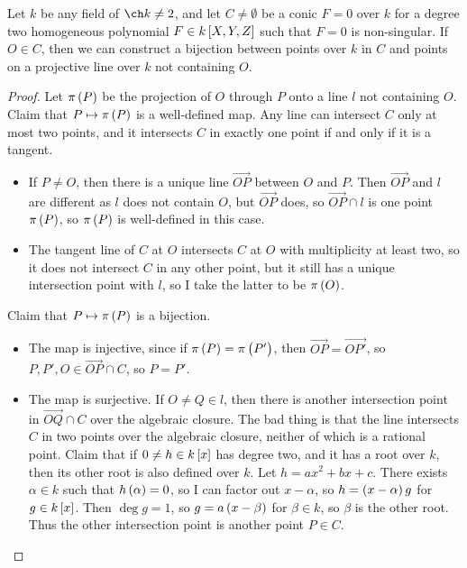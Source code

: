 
\begin{algorithm}
Let $ k $ be any field of $ \ch k \ne 2 $, and let $ C \ne \emptyset $ be a conic $ F = 0 $ over $ k $ for a degree two homogeneous polynomial $ F \in k\sbr{X, Y, Z} $ such that $ F = 0 $ is non-singular. If $ O \in C $, then we can construct a bijection between points over $ k $ in $ C $ and points on a projective line over $ k $ not containing $ O $.
\end{algorithm}

\begin{proof}
Let $ \pi\br{P} $ be the projection of $ O $ through $ P $ onto a line $ l $ not containing $ O $. Claim that $ P \mapsto \pi\br{P} $ is a well-defined map. Any line can intersect $ C $ only at most two points, and it intersects $ C $ in exactly one point if and only if it is a tangent.
\begin{itemize}
\item If $ P \ne O $, then there is a unique line $ \overrightarrow{OP} $ between $ O $ and $ P $. Then $ \overrightarrow{OP} $ and $ l $ are different as $ l $ does not contain $ O $, but $ \overrightarrow{OP} $ does, so $ \overrightarrow{OP} \cap l $ is one point $ \pi\br{P} $, so $ \pi\br{P} $ is well-defined in this case.
\item The tangent line of $ C $ at $ O $ intersects $ C $ at $ O $ with multiplicity at least two, so it does not intersect $ C $ in any other point, but it still has a unique intersection point with $ l $, so I take the latter to be $ \pi\br{O} $.
\end{itemize}
Claim that $ P \mapsto \pi\br{P} $ is a bijection.
\begin{itemize}
\item The map is injective, since if $ \pi\br{P} = \pi\br{P'} $, then $ \overrightarrow{OP} = \overrightarrow{OP'} $, so $ P, P', O \in \overrightarrow{OP} \cap C $, so $ P = P' $.
\item The map is surjective. If $ O \ne Q \in l $, then there is another intersection point in $ \overrightarrow{OQ} \cap C $ over the algebraic closure. The bad thing is that the line intersects $ C $ in two points over the algebraic closure, neither of which is a rational point. Claim that if $ 0 \ne h \in k\sbr{x} $ has degree two, and it has a root over $ k $, then its other root is also defined over $ k $. Let $ h = ax^2 + bx + c $. There exists $ \alpha \in k $ such that $ h\br{\alpha} = 0 $, so I can factor out $ x - \alpha $, so $ h = \br{x - \alpha}g $ for $ g \in k\sbr{x} $. Then $ \deg g = 1 $, so $ g = a\br{x - \beta} $ for $ \beta \in k $, so $ \beta $ is the other root. Thus the other intersection point is another point $ P \in C $.
\end{itemize}
\end{proof}

